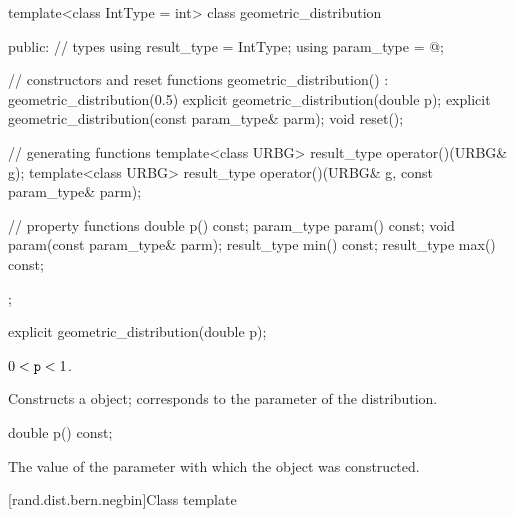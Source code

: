 %
\begin{codeblock}
template<class IntType = int>
  class geometric_distribution {
  public:
    // types
    using result_type = IntType;
    using param_type  = @\unspec@;

    // constructors and reset functions
    geometric_distribution() : geometric_distribution(0.5) {}
    explicit geometric_distribution(double p);
    explicit geometric_distribution(const param_type& parm);
    void reset();

    // generating functions
    template<class URBG>
      result_type operator()(URBG& g);
    template<class URBG>
      result_type operator()(URBG& g, const param_type& parm);

    // property functions
    double p() const;
    param_type param() const;
    void param(const param_type& parm);
    result_type min() const;
    result_type max() const;
  };
\end{codeblock}


%
\begin{itemdecl}
explicit geometric_distribution(double p);
\end{itemdecl}

\begin{itemdescr}
\pnum\requires
 $0 < \texttt{p} < 1$.

\pnum\effects Constructs a  object;
 corresponds to the parameter of the distribution.
\end{itemdescr}

%
\begin{itemdecl}
double p() const;
\end{itemdecl}

\begin{itemdescr}
\pnum\returns The value of the  parameter
 with which the object was constructed.
\end{itemdescr}


[rand.dist.bern.negbin]{Class template }
%
%


